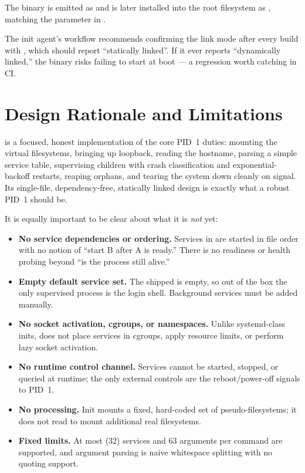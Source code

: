 The binary is emitted as  and is later installed into
the root filesystem as , matching the 
parameter in .

\begin{infobox}
The init agent's workflow recommends confirming the link mode after every build
with , which should report ``statically linked''.
If it ever reports ``dynamically linked,'' the binary risks failing to start at
boot --- a regression worth catching in CI.
\end{infobox}

\section{Design Rationale and Limitations}

 is a focused, honest implementation of the core PID~1 duties:
mounting the virtual filesystems, bringing up loopback, reading the hostname,
parsing a simple service table, supervising children with crash classification
and exponential-backoff restarts, reaping orphans, and tearing the system down
cleanly on signal. Its single-file, dependency-free, statically linked design is
exactly what a robust PID~1 should be.

It is equally important to be clear about what it is \emph{not} yet:

\begin{warnbox}
\begin{itemize}
  \item \textbf{No service dependencies or ordering.} Services in
         are started in file order with no notion of ``start
        B after A is ready.'' There is no readiness or health probing beyond
        ``is the process still alive.''
  \item \textbf{Empty default service set.} The shipped  is
        empty, so out of the box the only supervised process is the login shell.
        Background services must be added manually.
  \item \textbf{No socket activation, cgroups, or namespaces.} Unlike
        systemd-class inits,  does not place services in cgroups,
        apply resource limits, or perform lazy socket activation.
  \item \textbf{No runtime control channel.} Services cannot be started,
        stopped, or queried at runtime; the only external controls are the
        reboot/power-off signals to PID~1.
  \item \textbf{No  processing.} Init mounts a fixed,
        hard-coded set of pseudo-filesystems; it does not read 
        to mount additional real filesystems.
  \item \textbf{Fixed limits.} At most  (32) services and 63
        arguments per command are supported, and argument parsing is naive
        whitespace splitting with no quoting support.
\end{itemize}
\end{warnbox}

